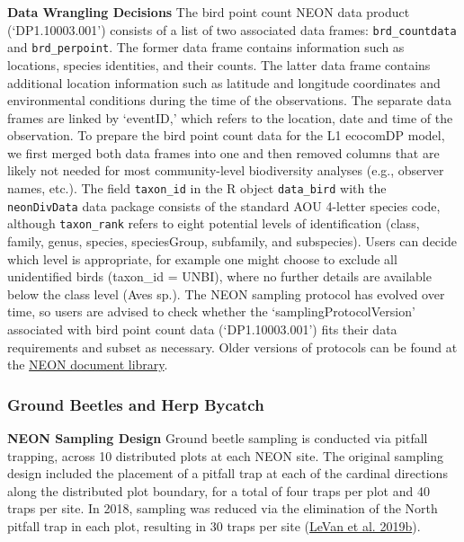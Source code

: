 \documentclass[
  12pt,
]{article}
\begin{document}
\textbf{Data Wrangling Decisions} The bird point count NEON data product (`DP1.10003.001') consists of a list of two associated data frames: \texttt{brd\_countdata} and \texttt{brd\_perpoint}. The former data frame contains information such as locations, species identities, and their counts. The latter data frame contains additional location information such as latitude and longitude coordinates and environmental conditions during the time of the observations. The separate data frames are linked by `eventID,' which refers to the location, date and time of the observation. To prepare the bird point count data for the L1 ecocomDP model, we first merged both data frames into one and then removed columns that are likely not needed for most community-level biodiversity analyses (e.g., observer names, etc.). The field \texttt{taxon\_id} in the R object \texttt{data\_bird} with the \texttt{neonDivData} data package consists of the standard AOU 4-letter species code, although \texttt{taxon\_rank} refers to eight potential levels of identification (class, family, genus, species, speciesGroup, subfamily, and subspecies). Users can decide which level is appropriate, for example one might choose to exclude all unidentified birds (taxon\_id = UNBI), where no further details are available below the class level (Aves sp.). The NEON sampling protocol has evolved over time, so users are advised to check whether the `samplingProtocolVersion' associated with bird point count data (`DP1.10003.001') fits their data requirements and subset as necessary. Older versions of protocols can be found at the \href{https://data.neonscience.org/documents/-/document_library_display/JEygRkSpUBoq/view/1883155?_110_INSTANCE_JEygRkSpUBoq_topLink=home\&_110_INSTANCE_JEygRkSpUBoq_delta1=20\&_110_INSTANCE_JEygRkSpUBoq_keywords=\&_110_INSTANCE_JEygRkSpUBoq_advancedSearch=false\&_110_INSTANCE_JEygRkSpUBoq_andOperator=true\&p_r_p_564233524_resetCur=false\&_110_INSTANCE_JEygRkSpUBoq_delta2=20\&_110_INSTANCE_JEygRkSpUBoq_cur2=1}{NEON document library}.

\hypertarget{ground-beetles-and-herp-bycatch}{%
\subsubsection{Ground Beetles and Herp Bycatch}\label{ground-beetles-and-herp-bycatch}}

\textbf{NEON Sampling Design} Ground beetle sampling is conducted via pitfall trapping, across 10 distributed plots at each NEON site. The original sampling design included the placement of a pitfall trap at each of the cardinal directions along the distributed plot boundary, for a total of four traps per plot and 40 traps per site. In 2018, sampling was reduced via the elimination of the North pitfall trap in each plot, resulting in 30 traps per site (\protect\hyperlink{ref-LeVan2019}{LeVan et al. 2019b}).
\end{document}
